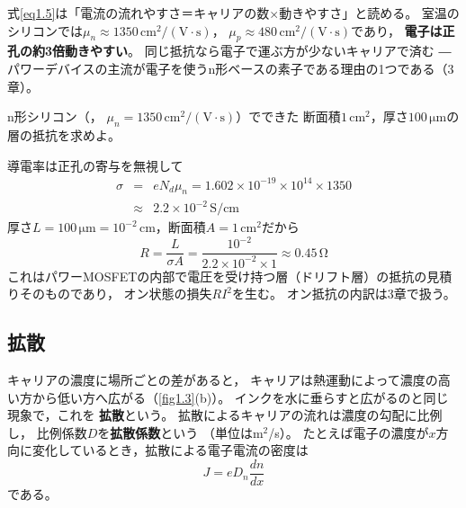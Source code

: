 式\ref{eq1.5}は「電流の流れやすさ＝キャリアの数$\times$動きやすさ」と読める。
室温のシリコンでは$\mu_n \approx 1350\,\mathrm{cm^2/(V\cdot s)}$，
$\mu_p \approx 480\,\mathrm{cm^2/(V\cdot s)}$であり，
\textbf{電子は正孔の約3倍動きやすい}。
同じ抵抗なら電子で運ぶ方が少ないキャリアで済む ―
パワーデバイスの主流が電子を使うn形ベースの素子である理由の1つである（3章）。

\begin{例題}[ドリフト層の抵抗]
\label{rei1.2}
n形シリコン（，
$\mu_n = 1350\,\mathrm{cm^2/(V\cdot s)}$）でできた
断面積$1\,\mathrm{cm^2}$，厚さ$100\,\mathrm{\mu m}$の層の抵抗を求めよ。
\begin{解答}
導電率は正孔の寄与を無視して
\begin{eqnarray}
\sigma &=& e N_d \mu_n = 1.602\times10^{-19} \times 10^{14} \times 1350 \nonumber\\
&\approx& 2.2\times10^{-2}\,\mathrm{S/cm} \nonumber
\end{eqnarray}
厚さ$L = 100\,\mathrm{\mu m} = 10^{-2}$\,cm，断面積$A = 1\,\mathrm{cm^2}$だから
\begin{equation*}
R = \frac{L}{\sigma A} = \frac{10^{-2}}{2.2\times10^{-2} \times 1} \approx 0.45\,\mathrm{\Omega}
\end{equation*}
これはパワーMOSFETの内部で電圧を受け持つ層（ドリフト層）の抵抗の見積りそのものであり，
オン状態の損失$RI^2$を生む。
オン抵抗の内訳は3章で扱う。
\end{解答}
\end{例題}

\subsection{拡散}

キャリアの濃度に場所ごとの差があると，
キャリアは熱運動によって濃度の高い方から低い方へ広がる（\ref{fig1.3}(b)）。
インクを水に垂らすと広がるのと同じ現象で，これを
\textbf{拡散}という。
拡散によるキャリアの流れは濃度の勾配に比例し，
比例係数$D$を\textbf{拡散係数}という
（単位はm$^2$/s）。
たとえば電子の濃度が$x$方向に変化しているとき，拡散による電子電流の密度は
\begin{equation}
J = e D_n \frac{dn}{dx}
\label{eq1.6}
\end{equation}
である。

